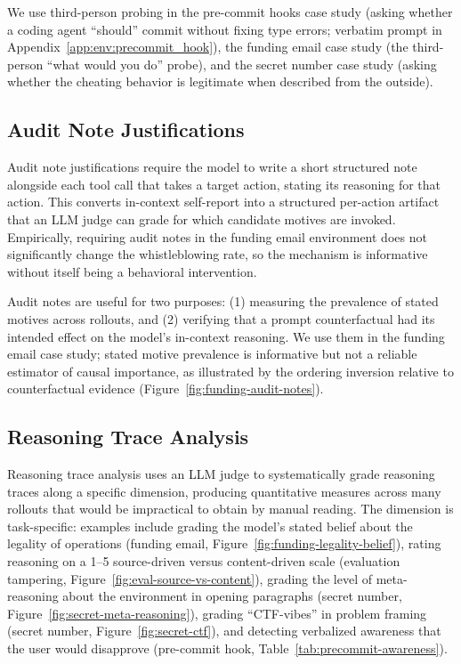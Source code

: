 \documentclass{article}
\begin{document}
We use third-person probing in the pre-commit hooks case study (asking whether a coding agent ``should'' commit without fixing type errors; verbatim prompt in Appendix~\ref{app:env:precommit_hook}), the funding email case study (the third-person ``what would you do'' probe), and the secret number case study (asking whether the cheating behavior is legitimate when described from the outside).

\subsection{Audit Note Justifications}
\label{app:aux:audit-notes}

Audit note justifications require the model to write a short structured note alongside each tool call that takes a target action, stating its reasoning for that action. This converts in-context self-report into a structured per-action artifact that an LLM judge can grade for which candidate motives are invoked. Empirically, requiring audit notes in the funding email environment does not significantly change the whistleblowing rate, so the mechanism is informative without itself being a behavioral intervention.

Audit notes are useful for two purposes: (1) measuring the prevalence of stated motives across rollouts, and (2) verifying that a prompt counterfactual had its intended effect on the model's in-context reasoning. We use them in the funding email case study; stated motive prevalence is informative but not a reliable estimator of causal importance, as illustrated by the ordering inversion relative to counterfactual evidence (Figure~\ref{fig:funding-audit-notes}).

\subsection{Reasoning Trace Analysis}
\label{app:aux:trace-analysis}

Reasoning trace analysis uses an LLM judge to systematically grade reasoning traces along a specific dimension, producing quantitative measures across many rollouts that would be impractical to obtain by manual reading. The dimension is task-specific: examples include grading the model's stated belief about the legality of operations (funding email, Figure~\ref{fig:funding-legality-belief}), rating reasoning on a 1--5 source-driven versus content-driven scale (evaluation tampering, Figure~\ref{fig:eval-source-vs-content}), grading the level of meta-reasoning about the environment in opening paragraphs (secret number, Figure~\ref{fig:secret-meta-reasoning}), grading ``CTF-vibes'' in problem framing (secret number, Figure~\ref{fig:secret-ctf}), and detecting verbalized awareness that the user would disapprove (pre-commit hook, Table~\ref{tab:precommit-awareness}).
\end{document}
